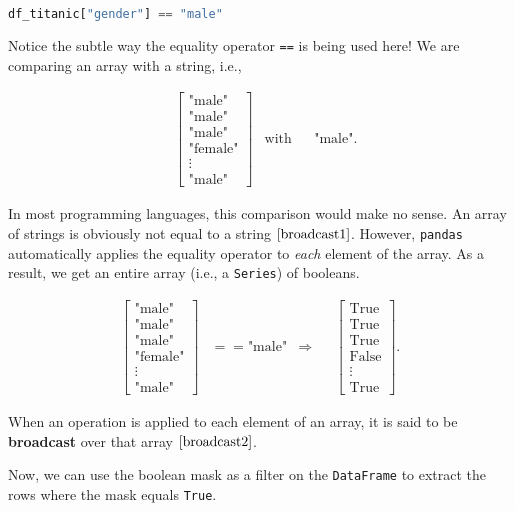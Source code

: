 \begin{lstlisting}[language=Python]
df_titanic["gender"] == "male"
\end{lstlisting}




Notice the subtle way the equality operator \verb|==| is being used here! We are comparing an array with a string, i.e.,

\begin{align}
& \begin{bmatrix} \text{"male"} \\ \text{"male"} \\ \text{"male"} \\ \text{"female"} \\ \vdots \\ \text{"male"} \end{bmatrix} & \text{with} & & \text{"male"}.
\label{broadcast1}\end{align}

In most programming languages, this comparison would make no sense. An array of strings is obviously not equal to a string $\eqref{broadcast1}$. However, \verb|pandas| automatically applies the equality operator to \textit{each} element of the array. As a result, we get an entire array (i.e., a \verb|Series|) of booleans.

\begin{align}
\begin{bmatrix} \text{"male"} \\ \text{"male"} \\ \text{"male"} \\ \text{"female"} \\ \vdots \\ \text{"male"} \end{bmatrix} &== \text{"male"} &\Longrightarrow & &  \begin{bmatrix} \text{True} \\ \text{True} \\ \text{True} \\ \text{False} \\ \vdots \\ \text{True} \end{bmatrix}.
\label{broadcast2}\end{align}

When an operation is applied to each element of an array, it is said to be \textbf{broadcast} over that array $\eqref{broadcast2}$.

Now, we can use the boolean mask as a filter on the \verb|DataFrame| to extract the rows where the mask equals \verb|True|.


